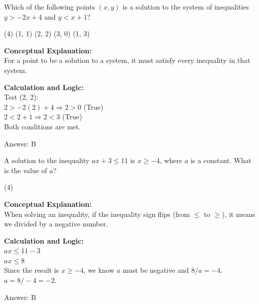 \documentclass[11pt,paper=a4,answers]{exam}
\begin{document}
\begin{questions}
\question
Which of the following points $(x, y)$ is a solution to the system of inequalities $y > -2x + 4$ and $y < x + 1$?
\begin{tasks}(4)
    \task (1, 1)
    \task (2, 2)
    \task (3, 0)
    \task (1, 3)
\end{tasks}

\begin{solution}
\textbf{Conceptual Explanation:} \\
For a point to be a solution to a system, it must satisfy every inequality in that system.

\vspace{10pt}
\textbf{Calculation and Logic:} \\
Test (2, 2): \\
$2 > -2(2) + 4 \Rightarrow 2 > 0$ (True) \\
$2 < 2 + 1 \Rightarrow 2 < 3$ (True) \\
Both conditions are met.

\vspace{15pt}
Answer: \colorbox{yellow!100}{B}
\end{solution}

\vspace{20pt}

\question
A solution to the inequality $ax + 3 \le 11$ is $x \ge -4$, where $a$ is a constant. What is the value of $a$?
\begin{tasks}(4)
\end{tasks}

\begin{solution}
\textbf{Conceptual Explanation:} \\
When solving an inequality, if the inequality sign flips (from $\le$ to $\ge$), it means we divided by a negative number.

\vspace{10pt}
\textbf{Calculation and Logic:} \\
$ax \le 11 - 3$ \\
$ax \le 8$ \\
Since the result is $x \ge -4$, we know $a$ must be negative and $8/a = -4$. \\
$a = 8 / -4 = -2$.

\vspace{15pt}
Answer: \colorbox{yellow!100}{B}
\end{solution}


\end{questions}
\end{document}
